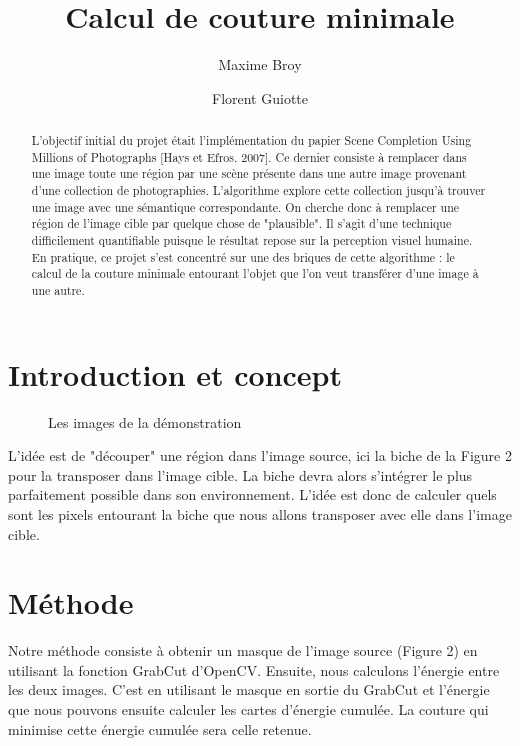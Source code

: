 \documentclass[a4paper]{article}
\title{Calcul de couture minimale}
\author{Maxime Broy \and Florent Guiotte}
\date{}
\begin{document}
\begin{abstract}
L'objectif initial du projet était l'implémentation du papier Scene Completion Using Millions of Photographs [Hays et Efros. 2007]. Ce dernier consiste à remplacer dans une image toute une région par une scène présente dans une autre image provenant d'une collection de photographies. L'algorithme explore cette collection jusqu'à trouver une image avec une sémantique correspondante. On cherche donc à remplacer une région de l'image cible par quelque chose de "plausible". Il s'agit d'une technique difficilement quantifiable puisque le résultat repose sur la perception visuel humaine. En pratique, ce projet s'est concentré sur une des briques de cette algorithme : le calcul de la couture minimale entourant l'objet que l'on veut transférer d'une image à une autre. 
\end{abstract}




\section{Introduction et concept}               %

\begin{figure}[!ht]%
    \centering
    \hspace{0.030\textwidth}
    \caption{Les images de la démonstration}
    \label{pres}
\end{figure}

L'idée est de "découper" une région dans l'image source, ici la biche de la Figure 2 pour la transposer dans l'image cible. La biche devra alors s'intégrer le plus parfaitement possible dans son environnement. L'idée est donc de calculer quels sont les pixels entourant la biche que nous allons transposer avec elle dans l'image cible.

\section{Méthode}         
Notre méthode consiste à obtenir un masque de l'image source (Figure 2) en utilisant la fonction GrabCut d'OpenCV. Ensuite, nous calculons l'énergie entre les deux images. C'est en utilisant le masque en sortie du GrabCut et l'énergie que nous pouvons ensuite calculer les cartes d'énergie cumulée. La couture qui minimise cette énergie cumulée sera celle retenue.
\end{document}

